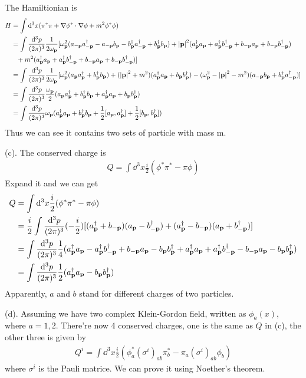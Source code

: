 \documentclass{article}
\newcommand{\ac}[1]{a_{\vb{#1}}}
\newcommand{\ad}[1]{a_{\vb{#1}}^{\dagger}}
\newcommand{\bc}[1]{b_{\vb{#1}}}
\newcommand{\bd}[1]{b_{\vb{#1}}^{\dagger}}
\newcommand{\omp}[1]{\omega_{\vb{#1}}}
\newcommand{\intphead}[1]{\int\frac{\dd^3#1}{(2\pi)^3}}
\begin{document}
The Hamiltionian is
\begin{align}
  \nonumber H&=\int\dd^3x(\pi^*\pi+\nabla{\phi^*}\cdot\nabla{\phi}+m^2\phi^*\phi)\\
  \nonumber&=\int\frac{\dd^3p}{(2\pi)^3}\frac{1}{2\omega_{\vb{p}}}[\omega_{\vb{p}}^2(\ac{-p}\ad{-p}-\ac{-p}\bc{p}-\bd{p}\ad{-p}+\bd{p}\bc{p})+\abs{\vb{p}}^2(\ad{p}\ac{p}+\ad{p}\bd{-p}+\bc{-p}\ac{p}+\bc{-p}\bd{-p})\\\nonumber&\phantom{=}+m^2(\ad{p}\ac{p}+\ad{p}\bd{-p}+\bc{-p}\ac{p}+\bc{-p}\bd{-p})]\\
  \nonumber&=\int\frac{\dd^3p}{(2\pi)^3}\frac{1}{2\omega_{\vb{p}}}[\omega_{\vb{p}}^2(\ac{p}\ad{p}+\bd{p}\bc{p})+(\abs{\vb{p}}^2+m^2)(\ad{p}\ac{p}+\bc{p}\bd{p})-(\omega_{\vb{p}}^2-\abs{\vb{p}}^2-m^2)(\ac{-p}\bc{p}+\bd{p}\ad{-p})]\\
  \nonumber&=\int\frac{\dd^3p}{(2\pi)^3}\frac{\omp{p}}{2}(\ac{p}\ad{p}+\bd{p}\bc{p}+\ad{p}\ac{p}+\bc{p}\bd{p})\\
  &=\int\frac{\dd^3p}{(2\pi)^3}\omp{p}(\ad{p}\ac{p}+\bd{p}\bc{p}+\frac{1}{2}[\ac{p},\ad{p}]+\frac{1}{2}[\bc{p},\bd{p}])
\end{align}
Thus we can see it contains two sets of particle with mass m.

\makebox{\phantom{2.1}}\quad(c).
The conserved charge is
\begin{align}
  Q=\int\dd^3x\frac{i}{2}(\phi^*\pi^*-\pi\phi)
\end{align}
Expand it and we can get
\begin{align}
  \nonumber Q&=\int\dd^3x\frac{i}{2}(\phi^*\pi^*-\pi\phi)\\
  \nonumber &=\frac{i}{2}\int\frac{\dd^3p}{(2\pi)^3}(-\frac{i}{2})[(\ad{p}+\bc{-p})(\ac{p}-\bd{-p})+(\ad{p}-\bc{-p})(\ac{p}+\bd{-p})]\\
  \nonumber&=\intphead{p}\frac{1}{4}(\ad{p}\ac{p}-\ad{p}\bd{-p}+\bc{-p}\ac{p}-\bc{p}\bd{p}+\ad{p}\ac{p}+\ad{p}\bd{-p}-\bc{-p}\ac{p}-\bc{p}\bd{p})\\
  &=\intphead{p}\frac{1}{2}(\ad{p}\ac{p}-\bc{p}\bd{p})
\end{align}
Apparently, $a$ and $b$ stand for different charges of two particles.

\makebox{\phantom{2.1}}\quad(d). Assuming we have two complex Klein-Gordon field, written as $\phi_a(x)$, where $a=1, 2$. There're now 4 conserved charges, one is the same as $Q$ in (c), the other three is given by
\begin{align}
  Q^i=\int\dd^3x\frac{i}{2}(\phi_a^*(\sigma^i)_{ab}\pi_b^*-\pi_a(\sigma^i)_{ab}\phi_b)
\end{align}
where $\sigma ^i$ is the Pauli matrice. We can prove it using Noether's theorem.
\end{document}
